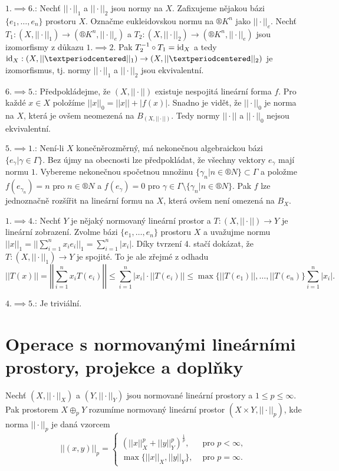 \documentclass[12pt]{article}					%
\begin{document}
\begin{veta}
\begin{dukazin}[Ze skript]
		$1. \implies 6.$: Nechť $||·||_1$ a $||·||_2$ jsou normy na $X$. Zafixujeme nějakou bázi $\{e_1, …, e_n\}$ prostoru $X$. Označme eukleidovskou normu na $®K^n$ jako $||·||_e$. Nechť $T_1: (X, ||·||_1) \rightarrow (®K^n, ||·||_e)$ a $T_2: (X, ||·||_2) \rightarrow (®K^n, ||·||_e)$ jsou izomorfismy z důkazu $1. \implies 2.$ Pak $T_2^{-1} \circ T_1 = \operatorname{id}_X$ a tedy $\id_X: (X, ||·||_1) \rightarrow (X, ||·||_2)$ je izomorfismus, tj. normy $||·||_1$ a $||·||_2$ jsou ekvivalentní.

		$6. \implies 5.$: Předpokládejme, že $(X, ||·||)$ existuje nespojitá lineární forma $f$. Pro každé $x \in X$ položíme $||x||_0 = ||x|| + |f(x)|$. Snadno je vidět, že $||·||_0$ je norma na $X$, která je ovšem neomezená na $B_{(X, ||·||)}$. Tedy normy $||·||$ a $||·||_0$ nejsou ekvivalentní.

		$5. \implies 1.$: Není-li $X$ konečněrozměrný, má nekonečnou algebraickou bázi $\{e_\gamma | \gamma \in \Gamma\}$. Bez újmy na obecnosti lze předpokládat, že všechny vektory $e_\gamma$ mají normu $1$. Vybereme nekonečnou spočetnou množinu $\{\gamma_n | n \in ®N\} \subset \Gamma$ a položme $f(e_{\gamma_n}) = n$ pro $n \in ®N$ a $f(e_\gamma) = 0$ pro $\gamma \in \Gamma \setminus \{\gamma_n | n \in ®N\}$. Pak $f$ lze jednoznačně rozšířit na lineární formu na $X$, která ovšem není omezená na $B_X$.

		$1. \implies 4.$: Nechť $Y$ je nějaký normovaný lineární prostor a $T: (X, ||·||) \rightarrow Y$ je lineární zobrazení. Zvolme bázi $\{e_1, …, e_n\}$ prostoru $X$ a uvažujme normu $||x||_1 = ||\sum_{i=1}^n x_i e_i||_1 = \sum_{i=1}^n |x_i|$. Díky tvrzení 4. stačí dokázat, že $T: (X, ||·||_1) \rightarrow Y$ je spojité. To je ale zřejmé z odhadu
		$$ ||T(x)|| = \left|\left| \sum_{i=1}^n x_i T(e_i) \right|\right| ≤ \sum_{i=1}^n |x_i|·||T(e_i)|| ≤ \max\{||T(e_1)||, …, ||T(e_n)\} \sum_{i=1}^n |x_i|. $$

		$4. \implies 5.$: Je triviální.
	\end{dukazin}
\end{veta}

\section{Operace s normovanými lineárními prostory, projekce a doplňky}
\begin{definice}
	Nechť $(X, ||·||_X)$ a $(Y, ||·||_Y)$ jsou normované lineární prostory a $1 ≤ p ≤ ∞$. Pak prostorem $X \oplus_p Y$ rozumíme normovaný lineární prostor $(X \times Y, ||·||_p)$, kde norma $||·||_p$ je daná vzorcem
	$$ ||(x, y)||_p = \begin{cases}(||x||^p_X + ||y||^p_Y)^{\frac{1}{p}}, & \text{ pro } p < ∞, \\ \max\{||x||_X, ||y||_Y\}, & \text{ pro } p = ∞.\end{cases} $$
\end{definice}
\end{document}
